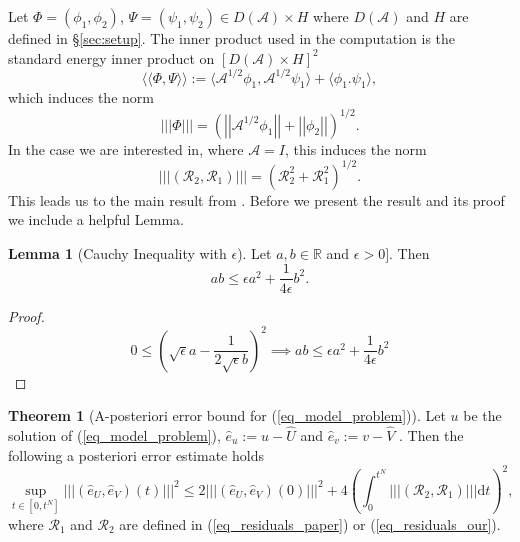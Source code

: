 \documentclass[12pt,a4paper]{article}
\numberwithin{equation}{section}
\theoremstyle{definition}
\newcommand{\pnorm}[1]{\left|\left|\left|#1\right|\right|\right|}
\newcommand{\qp}[1]{\left(#1\right)}
\newcommand{\qb}[1]{\left[#1\right]}
\newcommand{\rec}[1]{\widehat{{#1}}}
\newcommand{\Normgs}[1]{\left|\left|#1\right|\right|}
\newtheorem{Thm}[subsection]{Theorem}
\newtheorem{Lemma}[subsection]{Lemma}
\begin{document}
Let $\Phi=\qp{\phi_1, \phi_2}$, $\Psi =\qp{\psi_1,\psi_2}\in D\qp{\mathcal{A}}\times H$ where $D\qp{\mathcal{A}}$ and $H$ are defined in \S \ref{sec:setup}.  The inner product used in the computation is the standard energy inner product on $\qb{D\qp{\mathcal{A}}\times H}^2$
\begin{equation}\label{defn_innerprod}
\langle\langle \Phi,\Psi \rangle\rangle:= \langle \mathcal{A}^{1/2}\phi_1, \mathcal{A}^{1/2}\psi_1  \rangle + \langle \phi_1. \psi_1  \rangle,
\end{equation}
which induces the norm
\begin{equation}
\pnorm{\Phi} = \qp{\Normgs{\mathcal{A}^{1/2}\phi_1} + \Normgs{\phi_2}}^{1/2}.
\end{equation}
In the case we are interested in, where $\mathcal{A}=I$,  this induces the norm
\begin{equation}
\left|\left|\left|\left(\mathcal{R}_2, \mathcal{R}_1\right)\right|\right|\right| = (\mathcal{R}_2^2 +\mathcal{R}_1^2)^{1/2}.
\end{equation}
This leads us to the main result from \cite[Thm 3.1]{georgoulis2016posteriori}.  Before we present the result and its proof we include a helpful Lemma.
\begin{Lemma}[Cauchy Inequality with $\epsilon$]
	Let $a,b \in \mathbb{R}$ and $\epsilon>0]$.  Then
	\begin{equation}\label{eq_cauchy_ineq_eps}
	ab\leq \epsilon a^2 +\frac{1}{4\epsilon}b^2.
	\end{equation}
\end{Lemma}
\begin{proof}
	\begin{equation*}
	0\leq \qp{\sqrt{\epsilon}a-\frac{1}{2\sqrt{\epsilon}b}}^2\implies ab\leq \epsilon a^2 +\frac{1}{4\epsilon}b^2
	\end{equation*}
\end{proof}
\begin{Thm}[A-posteriori error bound for (\ref{eq_model_problem})]
Let $u$ be the solution of (\ref{eq_model_problem}), $\hat{e}_u:=u-\rec{U}$ and $\hat{e}_v:=v-\rec{V}$ .  Then the following a posteriori error estimate holds
\begin{equation}\label{eq_bound}
\sup_{t\in\qb{0,t^N}}\pnorm{\qp{\hat{e}_U,\hat{e}_V}\qp{t}}^2\leq
2\pnorm{\qp{\hat{e}_U,\hat{e}_V}\qp{0}}^2+
4\qp{\int_0^{t^N}\pnorm{\qp{\mathcal{R}_2,\mathcal{R}_1}}\mathrm{d}t}^2,
\end{equation}
where $\mathcal{R}_1$ and $\mathcal{R}_2$ are defined in (\ref{eq_residuals_paper}) or (\ref{eq_residuals_our}).
\end{Thm}
\end{document}
